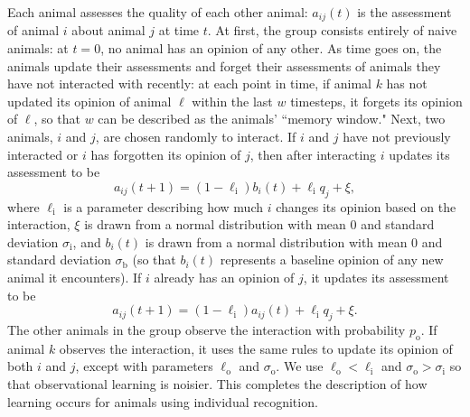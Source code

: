 Each animal assesses the quality of each other animal: $a_{ij}(t)$ is the assessment of animal $i$ about animal $j$ at time $t$.  At first, the group consists entirely of naive animals: at $t=0$, no animal has an opinion of any other. As time goes on, the animals update their assessments and forget their assessments of animals they have not interacted with recently: at each point in time, if animal $k$ has not updated its opinion of animal $\ell$ within the last $w$ timesteps, it forgets its opinion of $\ell$, so that $w$ can be described as the animals' ``memory window." Next, two animals, $i$ and $j$, are chosen randomly to interact. If $i$ and $j$ have not previously interacted or $i$ has forgotten its opinion of $j$, then after interacting $i$ updates its assessment to be
\begin{equation*}
a_{ij}(t+1)=(1-\ell_\text{i})b_{i}(t)+\ell_\text{i}q_j+\xi,
\end{equation*}
where $\ell_\text{i}$ is a parameter describing how much $i$ changes its opinion based on the interaction, $\xi$ is drawn from a normal distribution with mean $0$ and standard deviation $\sigma_\text{i}$, and $b_i(t)$ is drawn from a normal distribution with mean $0$ and standard deviation $\sigma_\text{b}$ (so that $b_i(t)$ represents a baseline opinion of any new animal it encounters). 
If $i$ already has an opinion of $j$, it updates its assessment to be 
\begin{equation*}
a_{ij}(t+1)=(1-\ell_\text{i})a_{ij}(t)+\ell_\text{i} q_j+\xi.
\end{equation*}
The other animals in the group observe the interaction with probability $p_\text{o}$. If animal $k$ observes the interaction, it uses the same rules to update its opinion of both $i$ and $j$, except with parameters $\ell_\text{o}$ and $\sigma_\text{o}$. We use $\ell_\text{o}<\ell_\text{i}$ and $\sigma_\text{o}>\sigma_\text{i}$ so that observational learning is noisier. This completes the description of how learning occurs for animals using individual recognition. 

